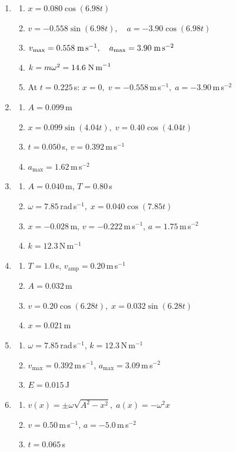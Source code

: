 \documentclass[12pt]{article}
\begin{document}
\begin{enumerate}[label=\textbf{Q\arabic*.}]
\item 
\begin{enumerate}[label=(\alph*)]
\item $\displaystyle x = 0.080\cos(6.98t)$
\item $v=-0.558\sin(6.98t),\quad a=-3.90\cos(6.98t)$
\item $v_\text{max}=0.558\;\text{m\,s}^{-1},\quad a_\text{max}=3.90\;\text{m\,s}^{-2}$
\item $k=m\omega^{2}=14.6\;\text{N\,m}^{-1}$
\item At $t=0.225$\,s: $x=0,\; v=-0.558$\,m\,s$^{-1},\; a=-3.90$\,m\,s$^{-2}$
\end{enumerate}

\item 
\begin{enumerate}[label=(\alph*)]
\item $A=0.099$\,m
\item $x=0.099\sin(4.04t),\; v=0.40\cos(4.04t)$
\item $t=0.050$\,s,\; $v=0.392$\,m\,s$^{-1}$
\item $a_\text{max}=1.62$\,m\,s$^{-2}$
\end{enumerate}

\item 
\begin{enumerate}[label=(\alph*)]
\item $A=0.040$\,m,\; $T=0.80$\,s
\item $\omega=7.85$\,rad\,s$^{-1},\; x=0.040\cos(7.85t)$
\item $x=-0.028$\,m,\; $v=-0.222$\,m\,s$^{-1}$,\; $a=1.75$\,m\,s$^{-2}$
\item $k=12.3$\,N\,m$^{-1}$
\end{enumerate}

\item 
\begin{enumerate}[label=(\alph*)]
\item $T=1.0$\,s,\; $v_\text{amp}=0.20$\,m\,s$^{-1}$
\item $A=0.032$\,m
\item $v=0.20\cos(6.28t),\; x=0.032\sin(6.28t)$
\item $x=0.021$\,m
\end{enumerate}

\item 
\begin{enumerate}[label=(\alph*)]
\item $\omega=7.85$\,rad\,s$^{-1}$,\; $k=12.3$\,N\,m$^{-1}$
\item $v_\text{max}=0.392$\,m\,s$^{-1}$,\; $a_\text{max}=3.09$\,m\,s$^{-2}$
\item $E=0.015$\,J
\end{enumerate}

\item 
\begin{enumerate}[label=(\alph*)]
\item $v(x)=\pm\omega\sqrt{A^{2}-x^{2}},\; a(x)=-\omega^{2}x$
\item $v=0.50$\,m\,s$^{-1}$,\; $a=-5.0$\,m\,s$^{-2}$
\item $t=0.065$\,s
\end{enumerate}
\end{enumerate}
\end{document}
